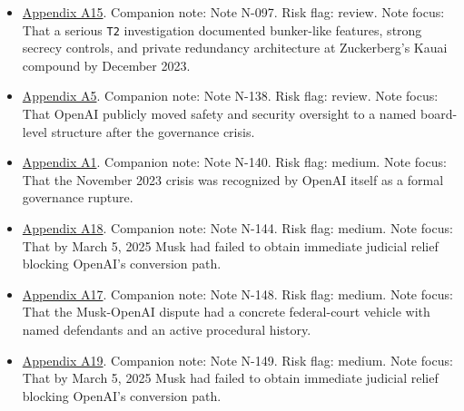 \documentclass[
  american,
  11pt,
  letterpaper,
]{article}
\begin{document}
\begin{itemize}
  \hyperref[appendix-a13-encyclical-letter-of-his-holiness-leo-xiv-magnifica-humanitas]{Appendix
  A13}. Companion note: Note N-095. Risk flag: review. Note focus: That
  by May 15, 2026, the AI legitimacy field had expanded into a formal
  Vatican encyclical rather than remaining confined to industry, policy,
  or technical discourse.
\item
  \hyperref[appendix-a15-inside-mark-zuckerbergs-top-secret-hawaii-compound]{Appendix
  A15}. Companion note: Note N-097. Risk flag: review. Note focus: That
  a serious \texttt{T2} investigation documented bunker-like features,
  strong secrecy controls, and private redundancy architecture at
  Zuckerberg's Kauai compound by December 2023.
\item
  \hyperref[appendix-a5-openai-board-forms-safety-and-security-committee]{Appendix
  A5}. Companion note: Note N-138. Risk flag: review. Note focus: That
  OpenAI publicly moved safety and security oversight to a named
  board-level structure after the governance crisis.
\item
  \hyperref[appendix-a1-openai-announces-leadership-transition]{Appendix
  A1}. Companion note: Note N-140. Risk flag: medium. Note focus: That
  the November 2023 crisis was recognized by OpenAI itself as a formal
  governance rupture.
\item
  \hyperref[appendix-a18-judge-denies-elon-musk-s-request-to-block-openai-for-profit-conversion-but-welcomes-trial]{Appendix
  A18}. Companion note: Note N-144. Risk flag: medium. Note focus: That
  by March 5, 2025 Musk had failed to obtain immediate judicial relief
  blocking OpenAI's conversion path.
\item
  \hyperref[appendix-a17-musk-v-altman-4-24-cv-04722]{Appendix A17}.
  Companion note: Note N-148. Risk flag: medium. Note focus: That the
  Musk-OpenAI dispute had a concrete federal-court vehicle with named
  defendants and an active procedural history.
\item
  \hyperref[appendix-a19-judge-denies-elon-musks-attempt-to-immediately-block-openais-conversion-to-for-profit-entity]{Appendix
  A19}. Companion note: Note N-149. Risk flag: medium. Note focus: That
  by March 5, 2025 Musk had failed to obtain immediate judicial relief
  blocking OpenAI's conversion path.
\end{itemize}
\end{document}
